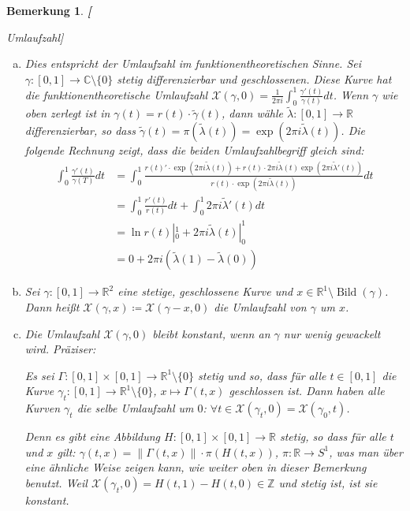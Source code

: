 \documentclass[12pt]{scrbook}   %
\newtheorem{bemX}[alles]{Bemerkung}
\newenvironment{bem}[1]{\begin{bemX}{\bf #1}\par\rm}{\end{bemX}}
\newcommand{\da}{\coloneqq}
\begin{document}
\begin{bem}[Umlaufzahl]
\begin{enumerate}[a)]
\item 
Dies entspricht der Umlaufzahl im funktionentheoretischen Sinne. Sei $\gamma:[0,1]\to \mathbb C\setminus\{0\}$ stetig differenzierbar und geschlossenen. Diese Kurve hat die funktionentheoretische Umlaufzahl $\mathcal X(\gamma,0)=\frac1{2\pi i}\int_0^1 \frac{\gamma'(t)}{\gamma(t)}dt$. Wenn $\gamma$ wie oben zerlegt ist in $\gamma(t) = r(t)\cdot \tilde\gamma(t)$, dann wähle $\tilde\lambda:[0,1]\to \mathbb R$ differenzierbar, so dass $\tilde\gamma(t)=\pi(\tilde\lambda(t)) = \exp(2\pi i\tilde\lambda(t))$. Die folgende Rechnung zeigt, dass die beiden Umlaufzahlbegriff gleich sind:
\begin{align*}
\int_0^1 \frac{\gamma'(t)}{\gamma(T)}dt &= \int_0^{1} \frac{r(t)'\cdot \exp(2\pi i\tilde\lambda(t)) + r(t) \cdot 2\pi i\tilde\lambda(t)\exp(2\pi i\tilde\lambda'(t))}{r(t)\cdot \exp(2\pi i \tilde \lambda(t))}dt \\
&= \int_0^1 \frac{r'(t)}{r(t)} dt + \int_0^1 2\pi i {\tilde\lambda'(t)}dt \\
&= \ln r(t)|_0^1 + 2\pi i\tilde \lambda(t)|_0^1 \\
&= 0+ 2\pi i(\tilde\lambda(1)-\tilde\lambda(0))
\end{align*}

\item 
Sei $\gamma:[0,1]\to \mathbb R^2$ eine stetige, geschlossene Kurve und $x\in \mathbb R^1\setminus \operatorname{Bild}(\gamma)$. Dann heißt $\mathcal X(\gamma,x)\da \mathcal X(\gamma-x,0)$ die \emph{Umlaufzahl} von $\gamma$ um $x$.

\item Die Umlaufzahl $\mathcal X(\gamma,0)$ bleibt konstant, wenn an $\gamma$ nur wenig gewackelt wird. Präziser:

Es sei $\Gamma:[0,1]\times[0,1]\to\mathbb R^1\setminus\{0\}$ stetig und so, dass für alle $t\in [0,1]$ die Kurve $\gamma_t:[0,1]\to \mathbb R^1\setminus\{0\}$, $x\mapsto \Gamma(t,x)$ geschlossen ist. Dann haben alle Kurven $\gamma_t$ die selbe Umlaufzahl um $0$: $\forall t\in \mathcal X(\gamma_t,0)=\mathcal X(\gamma_0,t)$.

Denn es gibt eine Abbildung $H:[0,1]\times[0,1]\to\mathbb R$ stetig, so dass für alle $t$ und $x$ gilt: $\gamma(t,x) =\|\Gamma(t,x)\|\cdot \pi(H(t,x))$, $\pi : \mathbb R \to S^1$, was man über eine ähnliche Weise zeigen kann, wie weiter oben in dieser Bemerkung benutzt. Weil $\mathcal X(\gamma_t,0)=H(t,1)-H(t,0)\in \mathbb Z$ und stetig ist, ist sie konstant.

\end{enumerate}
\end{bem}
\end{document}
